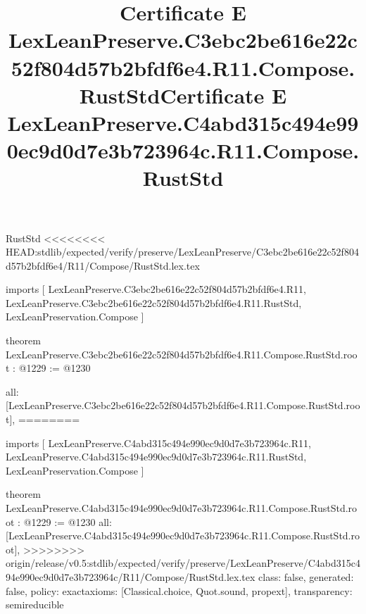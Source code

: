 \begin{lexlean}{RustStd}
<<<<<<<< HEAD:stdlib/expected/verify/preserve/LexLeanPreserve/C3ebc2be616e22c52f804d57b2bfdf6e4/R11/Compose/RustStd.lex.tex
\title{Certificate E LexLeanPreserve.C3ebc2be616e22c52f804d57b2bfdf6e4.R11.Compose.RustStd}
\begin{coremodule}
imports [
  LexLeanPreserve.C3ebc2be616e22c52f804d57b2bfdf6e4.R11,
  LexLeanPreserve.C3ebc2be616e22c52f804d57b2bfdf6e4.R11.RustStd,
  LexLeanPreservation.Compose
]

theorem LexLeanPreserve.C3ebc2be616e22c52f804d57b2bfdf6e4.R11.Compose.RustStd.root : @1229 := @1230 {
  all: [LexLeanPreserve.C3ebc2be616e22c52f804d57b2bfdf6e4.R11.Compose.RustStd.root],
========
\title{Certificate E LexLeanPreserve.C4abd315c494e990ec9d0d7e3b723964c.R11.Compose.RustStd}
\begin{coremodule}
imports [
  LexLeanPreserve.C4abd315c494e990ec9d0d7e3b723964c.R11,
  LexLeanPreserve.C4abd315c494e990ec9d0d7e3b723964c.R11.RustStd,
  LexLeanPreservation.Compose
]

theorem LexLeanPreserve.C4abd315c494e990ec9d0d7e3b723964c.R11.Compose.RustStd.root : @1229 := @1230 {
  all: [LexLeanPreserve.C4abd315c494e990ec9d0d7e3b723964c.R11.Compose.RustStd.root],
>>>>>>>> origin/release/v0.5:stdlib/expected/verify/preserve/LexLeanPreserve/C4abd315c494e990ec9d0d7e3b723964c/R11/Compose/RustStd.lex.tex
  class: false,
  generated: false,
  policy: exact{axioms: [Classical.choice, Quot.sound, propext]},
  transparency: semireducible
}


\end{coremodule}}
\end{coremodule}
\end{lexlean}
